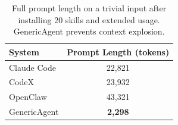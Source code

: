 \begin{table}[t]
\centering
\caption{Full prompt length on a trivial input after installing 20 skills and extended usage. GenericAgent prevents context explosion.}
\label{tab:context_explosion}
\begin{tabular}{lc}
\toprule
\textbf{System} & \textbf{Prompt Length (tokens)} \\
\midrule
Claude Code  & 22,821 \\
CodeX        & 23,932 \\
OpenClaw     & 43,321 \\
GenericAgent & \textbf{2,298} \\
\bottomrule
\end{tabular}
\end{table}
